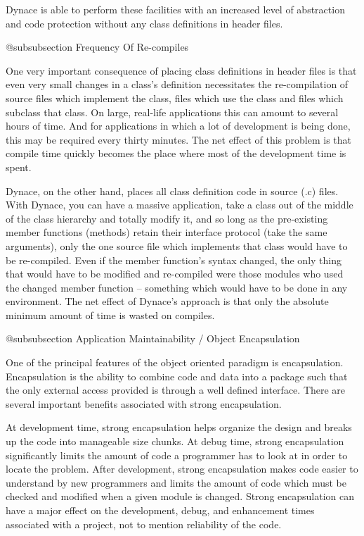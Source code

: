 Dynace is able to perform these facilities with an increased level
of abstraction and code protection without any class definitions
in header files.

@subsubsection Frequency Of Re-compiles

One very important consequence of placing class definitions in header
files is that even very small changes in a class's definition
necessitates the re-compilation of source files which implement the
class, files which use the class and files which subclass that class.
On large, real-life applications this can amount to several hours
of time.  And for applications in which a lot of development is
being done, this may be required every thirty minutes.  The net
effect of this problem is that compile time quickly becomes the
place where most of the development time is spent.

Dynace, on the other hand, places all class definition code in
source (.c) files.  With Dynace, you can have a massive application,
take a class out of the middle of the class hierarchy and totally
modify it, and so long as the pre-existing member functions (methods)
retain their interface protocol (take the same arguments), only the
one source file which implements that class would have to be
re-compiled.  Even if the member function's syntax changed, the only
thing that would have to be modified and re-compiled were those
modules who used the changed member function -- something which would
have to be done in any environment.  The net effect of Dynace's
approach is that only the absolute minimum amount of time is wasted
on compiles.

@subsubsection Application Maintainability / Object Encapsulation

One of the principal features of the object oriented paradigm is
encapsulation.  Encapsulation is the ability to combine code and data
into a package such that the only external access provided is through
a well defined interface.  There are several important benefits associated
with strong encapsulation.

At development time, strong encapsulation helps organize the design and
breaks up the code into manageable size chunks.  At debug time, strong
encapsulation significantly limits the amount of code a programmer
has to look at in order to locate the problem.  After development,
strong encapsulation makes code easier to understand by new programmers
and limits the amount of code which must be checked and modified when
a given module is changed.  Strong encapsulation can have a major
effect on the development, debug, and enhancement times associated
with a project, not to mention reliability of the code.

